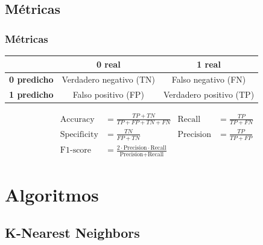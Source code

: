 \documentclass[10pt]{beamer}
\begin{document}
\subsection{M\'etricas}

\begin{frame}
	\frametitle{M\'etricas}
	\begin{table}[htbp]
		\centering
		\begin{tabular}{|c|c|c|}
			\hline
			& \textbf{0 real} & \textbf{1 real} \\
			\hline
			\textbf{0 predicho} & Verdadero negativo (TN) & Falso negativo (FN) \\
			\hline
			\textbf{1 predicho} & Falso positivo (FP) & Verdadero positivo (TP) \\
			\hline
		\end{tabular}
	\end{table}

	\begin{equation*}
		\begin{aligned}
			\text{Accuracy} &= \frac{TP + TN}{TP + FP + TN + FN} & \text{Recall} &= \frac{TP}{TP + FN} \\
			\text{Specificity} &= \frac{TN}{FP + TN} & \text{Precision} &= \frac{TP}{TP + FP} \\
			\text{F1-score} &= \frac{2\cdot \text{Precision}\cdot \text{Recall}}{\text{Precision} + \text{Recall}} & &
		\end{aligned}
	\end{equation*}
\end{frame}

\section{Algoritmos}

\subsection{K-Nearest Neighbors}
\end{document}
